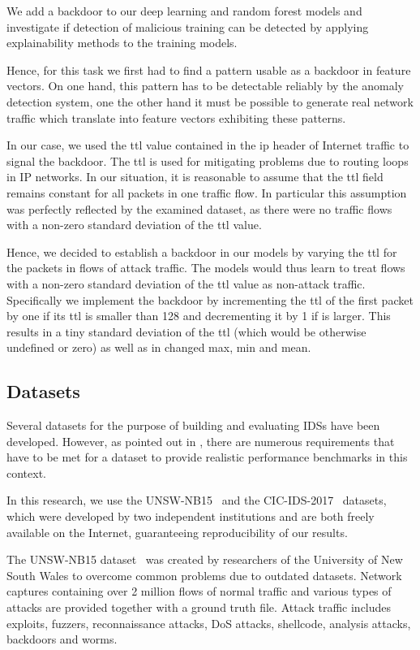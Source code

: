 \documentclass[10pt,sigconf,letterpaper,dvipsnames]{acmart}
\begin{document}
We add a backdoor to our deep learning and random forest models and investigate if detection of malicious training can be detected by applying explainability methods to the training models.

Hence, for this task we first had to find a pattern usable as a backdoor in feature vectors. On one hand, this pattern has to be detectable reliably by the anomaly detection system, one the other hand it must be possible to generate real network traffic which translate into feature vectors exhibiting these patterns.

In our case, we used the \gls{ttl} value contained in the \gls{ip} header of Internet traffic to signal the backdoor. The \gls{ttl} is used for mitigating problems due to routing loops in IP networks. In our situation, it is reasonable to assume that the \gls{ttl} field remains constant for all packets in one traffic flow. In particular this assumption was perfectly reflected by the examined dataset, as there were no traffic flows with a non-zero standard deviation of the \gls{ttl} value.

Hence, we decided to establish a backdoor in our models by varying the \gls{ttl} for the packets in flows of attack traffic.  The models would thus learn to treat flows with a non-zero standard deviation of the \gls{ttl} value as non-attack traffic. Specifically we implement the backdoor by incrementing the \gls{ttl} of the first packet by one if its \gls{ttl} is smaller than 128 and decrementing it by 1 if is larger. This results in a tiny standard deviation of the \gls{ttl} (which would be otherwise undefined or zero) as well as in changed max, min and mean.
\subsection{Datasets}
Several datasets for the purpose of building and evaluating IDSs have been developed. However, as pointed out in \cite{gharib_evaluation_2016}, there are numerous requirements that have to be met for a dataset to provide realistic performance benchmarks in this context.

In this research, we use the UNSW-NB15~\cite{moustafa_unsw-nb15:_2015} and the CIC-IDS-2017~\cite{sharafaldin_toward_2018} datasets, which were developed by two independent institutions and are both freely available on the Internet, guaranteeing reproducibility of our results.

The UNSW-NB15 dataset~\cite{moustafa_unsw-nb15:_2015} was created by researchers of the University of New South Wales to overcome common problems due to outdated datasets. Network captures containing over 2 million flows of normal traffic and various types of attacks are provided together with a ground truth file. Attack traffic includes exploits, fuzzers, reconnaissance attacks, DoS attacks, shellcode, analysis attacks, backdoors and worms.
\end{document}
